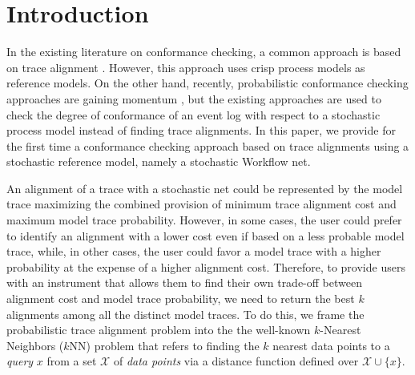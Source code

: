 
\section{Introduction}
\label{introduction}


In the existing literature on conformance checking, a common approach is based on trace alignment \cite{DBLP:conf/edoc/AdriansyahDA11}. However, this approach uses crisp process models as reference models. On the other hand, recently, probabilistic conformance checking approaches are gaining momentum \cite{DBLP:conf/bpm/LeemansSA19,DBLP:conf/icpm/PolyvyanyyK19,DBLP:journals/tosem/PolyvyanyySWCM20}, but
the existing approaches are used to check the degree of conformance of an event log with respect to a stochastic process model
instead of finding trace alignments.
In this paper, we provide for the first time a conformance checking approach based on trace alignments using a stochastic reference
model, namely a stochastic Workflow net.


An alignment of a trace with a stochastic net could be represented by the model trace maximizing the combined provision of minimum trace alignment cost and maximum model trace probability. However, in some cases, the user could prefer to identify an alignment with a lower cost even if based on a less probable model trace, while, in other cases, the user could favor a model trace with a higher probability at the expense of a higher alignment cost. Therefore, to provide users with an instrument that allows them to find their own trade-off between alignment cost and model trace probability, we need to return the best $k$ alignments among all the distinct model traces. To do this, we frame the probabilistic trace alignment problem into the the well-known $k$-Nearest Neighbors ($k$NN) problem \cite{Altman} that refers to finding the $k$ nearest data points to a \textit{query} $x$ from a set $\mathcal{X}$ of \textit{data points} via a distance function defined over $\mathcal{X}\cup\{x\}$.


